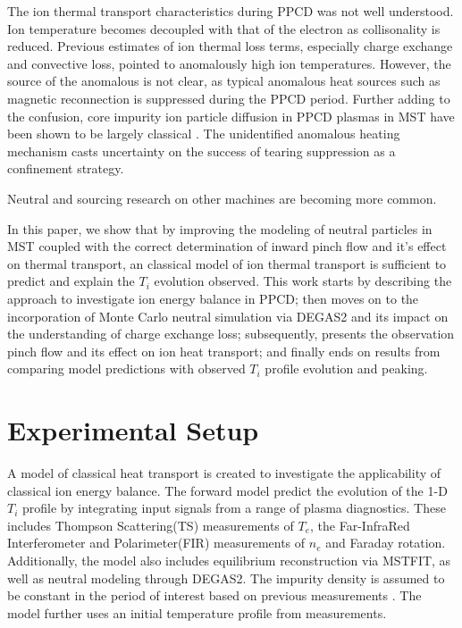 \documentclass[aip, pop, preprint]{revtex4-1}
\begin{document}
The ion thermal transport characteristics during PPCD was not well understood. Ion temperature becomes decoupled with that of the electron as collisonality is reduced. Previous estimates of ion thermal loss terms, especially charge exchange and convective loss, pointed to anomalously high ion temperatures\cite{Fiksel2006Confinement, Wyman2007THEPLASMAS, BiewerThesis}. However, the source of the anomalous is not clear, as typical anomalous heat sources such as magnetic reconnection is suppressed during the PPCD period. Further adding to the confusion, core impurity ion particle diffusion in PPCD plasmas in MST have been shown to be largely classical \cite{Kumar12prl}. The unidentified anomalous heating mechanism casts uncertainty on the success of tearing suppression as a confinement strategy.

Neutral and sourcing research on other machines are becoming more common. 

In this paper, we show that by improving the modeling of neutral particles in MST coupled with the correct determination of inward pinch flow and it's effect on thermal transport, an classical model of ion thermal transport is sufficient to predict and explain the $T_i$ evolution observed. This work starts by describing the approach to investigate ion energy balance in PPCD; then moves on to the incorporation of Monte Carlo neutral simulation via DEGAS2 and its impact on the understanding of charge exchange loss; subsequently, presents the observation pinch flow and its effect on ion heat transport; and finally ends on results from comparing model predictions with observed $T_{i}$ profile evolution and peaking.

\section{Experimental Setup}

A model of classical heat transport is created to investigate the applicability of classical ion energy balance. The forward model predict the evolution of the 1-D $T_i$ profile by integrating input signals from a range of plasma diagnostics. These includes Thompson Scattering(TS) measurements of $T_e$, the Far-InfraRed Interferometer and Polarimeter(FIR) measurements of $n_e$ and Faraday rotation. Additionally, the model also includes equilibrium reconstruction via MSTFIT\cite{Anderson04}, as well as neutral modeling through DEGAS2. The impurity density is assumed to be constant in the period of interest based on previous measurements \cite{Kumar12pop,Nornberg18FST}. The model further uses an initial temperature profile from measurements. 
\end{document}
